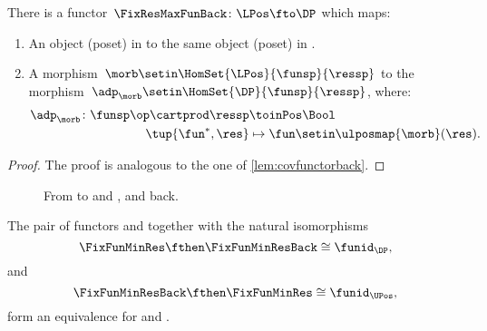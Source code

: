 \begin{lemma}
    \label{lem:cofunctorback}
    There is a functor~$\FixResMaxFunBack\colon \LPos \fto \DP$ which maps:
    \begin{enumerate}
        \item An object (poset) in \UPos to the same object (poset) in \DP.
        \item A morphism~$\morb\setin \HomSet{\LPos}{\funsp}{\ressp}$ to the morphism~$\adp_\morb \setin \HomSet{\DP}{\funsp}{\ressp}$, where:
              \begin{equation}
                  \begin{aligned}
                      \adp_\morb\colon \funsp\op \cartprod \ressp & \toinPos \Bool \\
                      \tup{\fun^*,\res}                           & \mapsto \fun \setin \ulposmap{\morb}(\res).
                  \end{aligned}
              \end{equation}
    \end{enumerate}
\end{lemma}

\begin{proof}
    The proof is analogous to the one of \cref{lem:covfunctorback}.
\end{proof}

\begin{figure}[tbh]
    \centering
    \caption{From \DP to \UPos and \LPos, and back.}
\end{figure}


\begin{lemma}
    The pair of functors \FixFunMinRes and \FixFunMinResBack together with the natural isomorphisms
    \begin{equation*}
        \FixFunMinRes \fthen \FixFunMinResBack \cong \funid_\DP,
    \end{equation*}
    and
    \begin{equation*}
        \FixFunMinResBack \fthen \FixFunMinRes \cong \funid_\UPos,
    \end{equation*}
    form an equivalence for \DP and \UPos.
\end{lemma}


